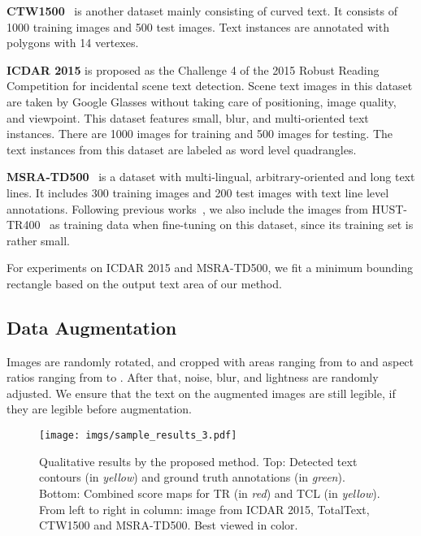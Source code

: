 \documentclass[runningheads]{llncs}
\begin{document}
\textbf{CTW1500}~\cite{Yuliang2017Detecting} is another dataset mainly consisting of curved text. It consists of 1000 training images and 500 test images. Text instances are annotated with polygons with 14 vertexes.

\textbf{ICDAR 2015} is proposed as the Challenge 4 of the 2015 Robust Reading Competition \cite{karatzas2015icdar} for incidental scene text detection. Scene text images in this dataset are taken by Google Glasses without taking care of positioning, image quality, and viewpoint. This dataset features small, blur, and multi-oriented text instances. There are 1000 images for training  and 500 images for testing. The text instances from this dataset are labeled as word level quadrangles. 

\textbf{MSRA-TD500}~\cite{yao2012detecting} is a dataset with multi-lingual, arbitrary-oriented and long text lines. It includes 300 training images and 200 test images with text line level annotations. Following previous works~\cite{Zhou_2017_CVPR,Lyu2018}, we also include the images from HUST-TR400~\cite{yao2014unified} as training data when fine-tuning on this dataset, since its training set is rather small. 

For experiments on ICDAR 2015 and MSRA-TD500, we fit a minimum bounding rectangle based on the output text area of our method.

\subsection{Data Augmentation}

Images are randomly rotated, and cropped with areas ranging from  to  and aspect ratios ranging from  to . After that, noise, blur, and lightness are randomly adjusted. We ensure that the text on the augmented images are still legible, if they are legible before augmentation.


\begin{figure*}
\begin{centering}
\texttt{[image: imgs/sample\_results\_3.pdf]}
\par\end{centering}
\vspace{-5mm}
\caption{Qualitative results by the proposed method. Top: Detected text contours (in \textit{yellow}) and ground truth annotations (in \textit{green}). Bottom: Combined score maps for TR (in \textit{red}) and TCL (in \textit{yellow}). From left to right in column: image from ICDAR 2015, TotalText, CTW1500 and MSRA-TD500. Best viewed in color.}
\label{img_samples}
\vspace{-3mm}
\end{figure*}
\end{document}
